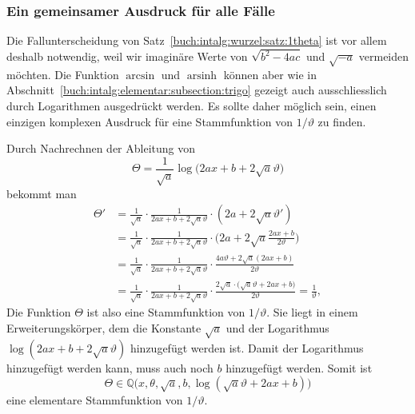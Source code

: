 %
%
\subsubsection{Ein gemeinsamer Ausdruck für alle Fälle}
Die Fallunterscheidung von Satz~\ref{buch:intalg:wurzel:satz:1theta}
ist vor allem deshalb notwendig, weil wir imaginäre Werte von
$\!\sqrt{b^2-4ac}$ und $\!\sqrt{-a}$ vermeiden möchten.
Die Funktion $\arcsin$ und $\operatorname{arsinh}$ können aber
wie in Abschnitt~\ref{buch:intalg:elementar:subsection:trigo}
gezeigt auch ausschliesslich durch Logarithmen ausgedrückt werden.
Es sollte daher möglich sein, einen einzigen komplexen
Ausdruck für eine Stammfunktion von $1/\vartheta$ zu finden.

Durch Nachrechnen der Ableitung von
\[
\Theta
=
\frac{1}{\!\sqrt{a}}
\log\bigl(
2ax + b + 2\!\sqrt{a} \vartheta
\bigr)
\]
bekommt man
\begin{align*}
\Theta'
&=
\frac{1}{\!\sqrt{a}}
\cdot
\frac{1}{2ax+b+2\!\sqrt{a}\vartheta}
\cdot
(2a + 2\!\sqrt{a}\vartheta')
\\
&=
\frac{1}{\!\sqrt{a}}
\cdot
\frac{1}{2ax+b+2\!\sqrt{a}\vartheta}
\cdot
\biggl(
2a +2\!\sqrt{a}\frac{2ax+b}{2\vartheta}
\biggr)
\\
&=
\frac{1}{\!\sqrt{a}}
\cdot
\frac{1}{2ax+b+2\!\sqrt{a}\vartheta}
\cdot
\frac{
4a\vartheta +2\!\sqrt{a}(2ax+b)
}{
2\vartheta
}
\\
&=
\frac{1}{\!\sqrt{a}}
\cdot
\frac{1}{2ax+b+2\!\sqrt{a}\vartheta}
\cdot
\frac{
2\!\sqrt{a}\cdot
\bigl(
\!\sqrt{a}\vartheta
+
2ax+b
\bigr)
}{
2\vartheta
}
=
\frac{1}{\vartheta},
\end{align*}
Die Funktion $\Theta$ ist also eine Stammfunktion von $1/\vartheta$.
Sie liegt in einem Erweiterungskörper, dem die Konstante $\!\sqrt{a}$
und der Logarithmus $\log(2ax+b+2\!\sqrt{a}\vartheta)$ hinzugefügt
werden ist.
Damit der Logarithmus hinzugefügt werden kann, muss auch noch $b$
hinzugefügt werden.
Somit ist
\[
\Theta
\in
\mathbb{Q}\bigl(x,\theta,\!\sqrt{a},b,\log(\!\sqrt{a}\vartheta+2ax+b)\bigr)
\]
eine elementare Stammfunktion von $1/\vartheta$.

